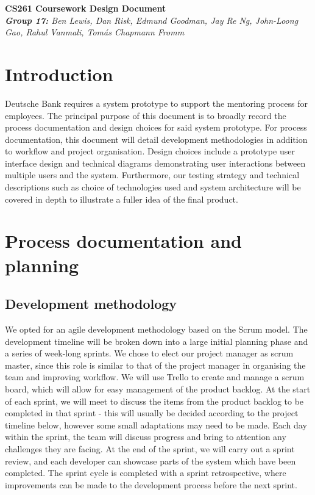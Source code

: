 \documentclass[10pt]{article}
\begin{document}
\begin{center}
    \Huge\textbf{CS261 Coursework Design Document}\\
    \vspace{2mm}
    \large{\textit{\textbf{Group 17:} Ben Lewis, Dan Risk, Edmund Goodman,
    Jay Re Ng, John-Loong Gao, Rahul Vanmali, Tomás Chapmann Fromm}}
\end{center}


\section{Introduction}
Deutsche Bank requires a system prototype to support the mentoring process for
employees. The principal purpose of this document is to broadly record the
process documentation and design choices for said system prototype. For process
documentation, this document will detail development methodologies in addition
to workflow and project organisation. Design choices include a prototype user
interface design and technical diagrams demonstrating user interactions between
multiple users and the system. Furthermore, our testing strategy and technical
descriptions such as choice of technologies used and system architecture will be
covered in depth to illustrate a fuller idea of the final product.

\section{Process documentation and planning}
\subsection{Development methodology}
We opted for an agile development methodology based on the Scrum model. The
development timeline will be broken down into a large initial planning phase and
a series of week-long sprints. We chose to elect our project manager as scrum
master, since this role is similar to that of the project manager in organising
the team and improving workflow. We will use Trello to create and manage a scrum
board, which will allow for easy management of the product backlog. At the start
of each sprint, we will meet to discuss the items from the product backlog to be
completed in that sprint - this will usually be decided according to the project
timeline below, however some small adaptations may need to be made. Each day
within the sprint, the team will discuss progress and bring to attention any
challenges they are facing. At the end of the sprint, we will carry out a sprint
review, and each developer can showcase parts of the system which have been
completed. The sprint cycle is completed with a sprint retrospective, where
improvements can be made to the development process before the next sprint.
\end{document}
